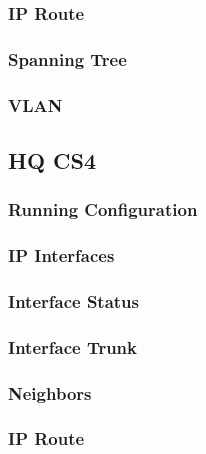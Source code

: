 \subsubsection{IP Route}


\subsubsection{Spanning Tree}


\subsubsection{VLAN}






\subsection{HQ CS4}
\subsubsection{Running Configuration}


\subsubsection{IP Interfaces}


\subsubsection{Interface Status}


\subsubsection{Interface Trunk}


\subsubsection{Neighbors}


\subsubsection{IP Route}


